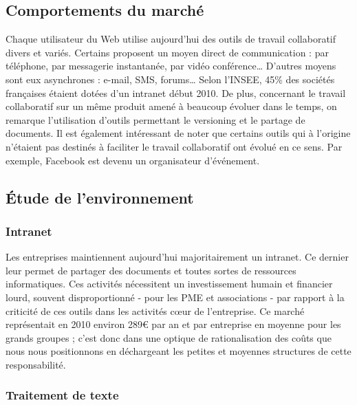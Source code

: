 \documentclass[10pt,twocolumn,a4paper,utf8x]{article}
\begin{document}
\subsection{Comportements du marché}

Chaque utilisateur du Web utilise aujourd'hui des outils de travail
collaboratif divers et variés. Certains proposent un moyen direct de
communication : par téléphone, par messagerie instantanée, par vidéo
conférence\ldots{} D'autres moyens sont eux asynchrones : e-mail, SMS,
forums\ldots{} Selon l'INSEE, 45\% des sociétés françaises étaient
dotées d'un intranet début 2010. De plus, concernant le travail
collaboratif sur un même produit amené à beaucoup évoluer dans le temps,
on remarque l'utilisation d'outils permettant le versioning et le
partage de documents. Il est également intéressant de noter que certains
outils qui à l'origine n'étaient pas destinés à faciliter le travail
collaboratif ont évolué en ce sens. Par exemple, Facebook est devenu un
organisateur d'événement.

\subsection{Étude de l'environnement}

\subsubsection{Intranet}

Les entreprises maintiennent aujourd'hui majoritairement un intranet. Ce
dernier leur permet de partager des documents et toutes sortes de
ressources informatiques. Ces activités nécessitent un investissement
humain et financier lourd, souvent disproportionné - pour les PME et
associations - par rapport à la criticité de ces outils dans les
activités cœur de l'entreprise. Ce marché représentait en 2010 environ
289\euro{} par an et par entreprise en moyenne pour les grands
groupes ; c'est donc dans une optique de rationalisation des coûts que
nous nous positionnons en déchargeant les petites et moyennes structures
de cette responsabilité.

\subsubsection{Traitement de texte}
\end{document}
